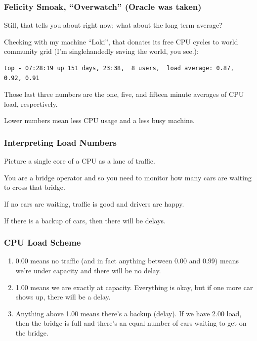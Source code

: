 \begin{frame}[fragile]
\frametitle{Felicity Smoak, ``Overwatch'' (Oracle was taken)}

Still, that tells you about right now; what about the long term average? 

Checking with my machine ``Loki'', that donates its free CPU cycles to world community grid (I'm singlehandedly saving the world, you see.):

{\scriptsize
\begin{verbatim}
top - 07:28:19 up 151 days, 23:38,  8 users,  load average: 0.87, 0.92, 0.91
\end{verbatim}
}

Those last three numbers are the one, five, and fifteen minute averages of CPU load, respectively. 

Lower numbers mean less CPU usage and a less busy machine. 

\end{frame}




\begin{frame}
\frametitle{Interpreting Load Numbers}

Picture a single core of a CPU as a lane of traffic. 

You are a bridge operator and so you need to monitor how many cars are waiting to cross that bridge. 

If no cars are waiting, traffic is good and drivers are happy. 

If there is a backup of cars, then there will be delays.


\end{frame}



\begin{frame}
\frametitle{CPU Load Scheme}

\begin{enumerate}
	\item 0.00 means no traffic (and in fact anything between 0.00 and 0.99) means we're under capacity and there will be no delay.
	\item 1.00 means we are exactly at capacity. Everything is okay, but if one more car shows up, there will be a delay.
	\item Anything above 1.00 means there's a backup (delay). If we have 2.00 load, then the bridge is full and there's an equal number of cars waiting to get on the bridge. 
\end{enumerate}


\end{frame}



